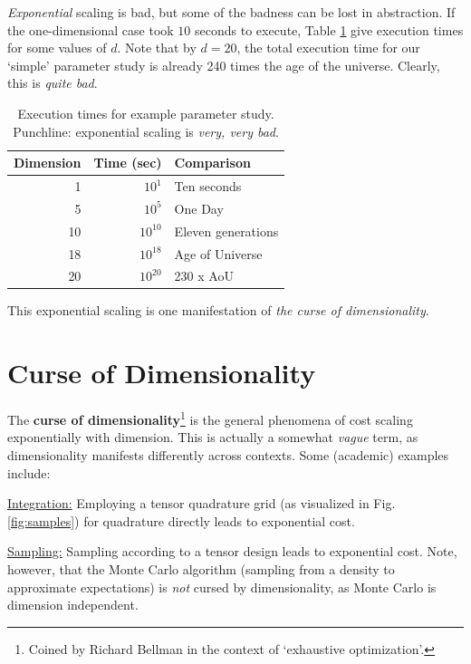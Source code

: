 \documentclass{article}
\begin{document}
\emph{Exponential} scaling is bad, but some of the badness can be lost in
abstraction. If the one-dimensional case took $10$ seconds to execute, Table
\ref{tab:exponential} give execution times for some values of $d$. Note that by
$d=20$, the total execution time for our `simple' parameter study is already 240
times the age of the universe. Clearly, this is \emph{quite bad}.

\begin{table}[!ht]
  \centering
  \begin{tabular}{r|r|l}
  \toprule
  Dimension & Time (sec) & Comparison\\
  \midrule
  1 & $10^{1}$ & Ten seconds\\
  5 & $10^{5}$ & One Day\\
  10 & $10^{10}$ & Eleven generations\\
  18 & $10^{18}$ & Age of Universe\\
  20 & $10^{20}$ & 230 x AoU\\
  \bottomrule
  \end{tabular}
  \caption{Execution times for example parameter study. Punchline: exponential
    scaling is \emph{very, very bad}.}
  \label{tab:exponential}
\end{table}

This exponential scaling is one manifestation of \emph{the curse of
  dimensionality}.

\section{Curse of Dimensionality}
The \textbf{curse of dimensionality}\footnote{Coined by Richard Bellman in the
  context of `exhaustive optimization'.} is the general phenomena of cost
scaling exponentially with dimension. This is actually a somewhat \emph{vague}
term, as dimensionality manifests differently across
contexts.\cite{donoho2000high} Some (academic) examples include:

\bigskip\noindent\underline{Integration:} Employing a tensor quadrature grid (as
visualized in Fig. \ref{fig:samples}) for quadrature directly leads to
exponential cost.

\bigskip\noindent\underline{Sampling:} Sampling according to a tensor design
leads to exponential cost. Note, however, that the Monte Carlo algorithm
(sampling from a density to approximate expectations) is \emph{not} cursed by
dimensionality, as Monte Carlo is dimension
independent.\cite{owen2013montecarlo}
\end{document}
